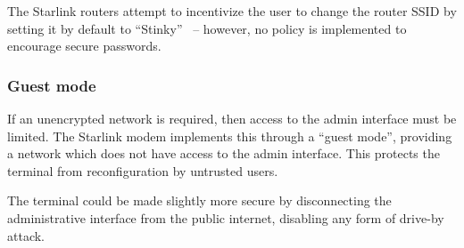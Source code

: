 The Starlink routers attempt to incentivize the user to change the router SSID by setting it by default to ``Stinky''~\cite{stinky_starlink} -- however, no policy is implemented to encourage secure passwords.

\subsubsection{Guest mode}

If an unencrypted network is required, then access to the admin interface must be limited.
The Starlink modem implements this through a ``guest mode'', providing a network which does not have access to the admin interface.
This protects the terminal from reconfiguration by untrusted users.

The terminal could be made slightly more secure by disconnecting the administrative interface from the public internet, disabling any form of drive-by attack.

\begin{comment}
  Edd's notes:

Related work:

Zoom exploit, hitting services running on the local network

https://developer.mozilla.org/en-US/docs/Web/Security/Same-origin_policy
"Cross-origin writes are typically allowed"

https://bugzilla.mozilla.org/show_bug.cgi?id=629094
https://www.grepular.com/Abusing_HTTP_Status_Codes_to_Expose_Private_Information
HTTP status code abuse to extract information cross-origin

https://bugzilla.mozilla.org/show_bug.cgi?id=354493
Zoom videoconferencing problem

https://bugzilla.mozilla.org/show_bug.cgi?id=371598
Drive-by pharming through browsers


Security constraints:

Defeating drive-by javascript:
unencrypted passwords prevents silent drive-by javascript, potentially
websites can still brute force or phish the password from you
some sort of CSRF token from http://my.starlink.com?

Defeating spoofing http://my.starlink.com:
Vulnerable: because it's using plaintext http
Reason: you can't make a request to an insecure origin from a secure origin (need citation)
use https
passwords prevent silently changing the dish

Attackers on local network:

HSTS could be used with TLS to secure this
CSRF tokens

%


\end{comment}
